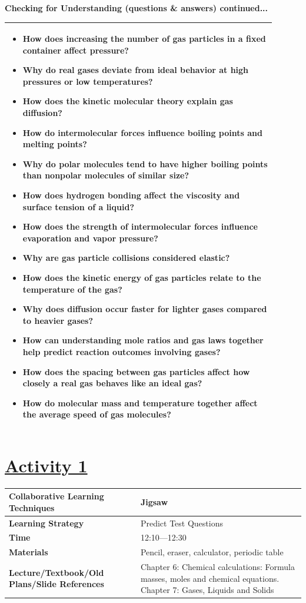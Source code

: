 \documentclass{article}
\begin{document}
{\newpage
\noindent
{\large\textbf{Checking for Understanding (questions \& answers) continued...} \\
\vspace{0.2cm}
\begin{tabular}{|p{0.9\linewidth}|}
\hline
\begin{itemize}
\item How does increasing the number of gas particles in a fixed container affect pressure?
\item Why do real gases deviate from ideal behavior at high pressures or low temperatures?
\item How does the kinetic molecular theory explain gas diffusion?
\item How do intermolecular forces influence boiling points and melting points?
\item Why do polar molecules tend to have higher boiling points than nonpolar molecules of similar size?
\item How does hydrogen bonding affect the viscosity and surface tension of a liquid?
\item How does the strength of intermolecular forces influence evaporation and vapor pressure?
\item Why are gas particle collisions considered elastic?
\item How does the kinetic energy of gas particles relate to the temperature of the gas?
\item Why does diffusion occur faster for lighter gases compared to heavier gases?
\item How can understanding mole ratios and gas laws together help predict reaction outcomes involving gases?
\item How does the spacing between gas particles affect how closely a real gas behaves like an ideal gas?
\item How do molecular mass and temperature together affect the average speed of gas molecules?
\end{itemize} \\
\hline
\end{tabular}


\section*{\underline{Activity 1}}
\vspace{0.2cm}
\begin{tabular}{|p{4.2cm}|p{9.8cm}|}
\hline
\textbf{Collaborative Learning Techniques} & Jigsaw\\
\hline
\textbf{Learning Strategy} & Predict Test Questions \\
\hline
\textbf{Time} & 12:10---12:30\\
\hline
\textbf{Materials} & Pencil, eraser, calculator, periodic table \\
\hline
\textbf{Lecture/Textbook/Old Plans/Slide References} & Chapter 6: Chemical calculations: Formula masses, moles and chemical equations. Chapter 7: Gases, Liquids and Solids \\
\hline
\end{tabular}
\vspace{0.5cm}

}}
\end{document}
